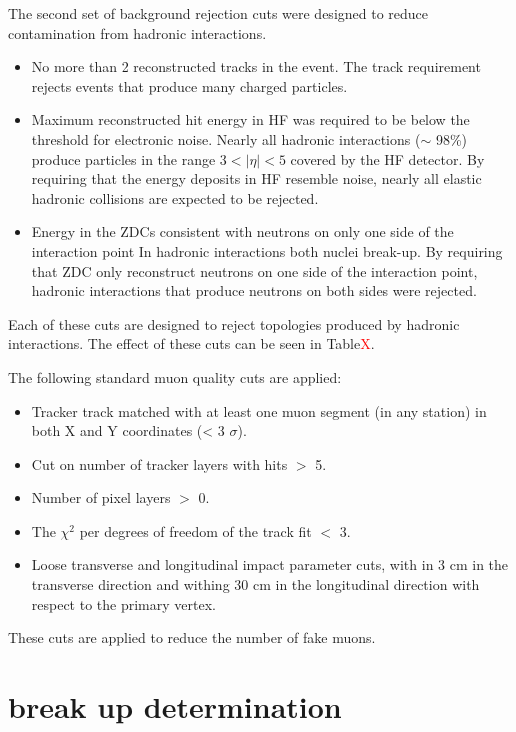       The second set of background rejection cuts were designed to 
        reduce contamination from hadronic interactions. 
      \begin{itemize}
  	    \item No more than 2 reconstructed tracks in the event.
          The track requirement rejects events that produce many charged 
          particles.
  	    \item Maximum reconstructed hit energy in HF was required to be below 
            the threshold for electronic noise. 
          Nearly all hadronic interactions ($\sim$ 98\%) produce particles in the 
            range $3<|\eta|<5$ covered by the HF detector.
          By requiring that the energy deposits in HF resemble noise, nearly all
            elastic hadronic collisions are expected to be rejected.
  	    \item Energy in the ZDCs consistent with neutrons on only one side 
            of the interaction point
          In hadronic interactions both nuclei break-up. 
          By requiring that ZDC only reconstruct neutrons on one side of the 
            interaction point, hadronic interactions that produce neutrons on both 
            sides were rejected.
      \end{itemize}
      Each of these cuts are designed to reject topologies produced by hadronic
        interactions.
      The effect of these cuts can be seen in Table\textcolor{red}{X}.
  
      The following standard muon quality cuts are applied:
      \begin{itemize}
        \item Tracker track matched with at least one muon segment 
          (in any station) in both X and Y coordinates (< 3 $\sigma$).
        \item Cut on number of tracker layers with hits $>$ 5.
        \item Number of pixel layers $>$ 0.
        \item The $\chi^{2}$ per degrees of freedom of the track fit $<$ 3. 
        \item Loose transverse and longitudinal impact parameter cuts, with in 3 
          cm in the transverse direction and withing 30 cm in the longitudinal 
          direction with respect to the primary vertex.
      \end{itemize}
       These cuts are applied to reduce the number of fake muons.
  
  \section{break up determination}
